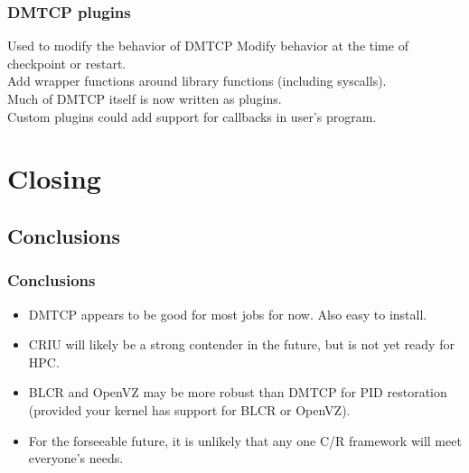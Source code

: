 \documentclass[compress]{beamer}
\begin{document}
\begin{frame}
\frametitle{DMTCP plugins}

\begin{block}{Used to modify the behavior of DMTCP}
Modify behavior at the time of checkpoint or restart.\\
\vspace{1ex}
Add wrapper functions around library functions (including syscalls).\\ 
\vspace{1ex}
Much of DMTCP itself is now written as plugins.\\
\vspace{1ex}
Custom plugins could add support for callbacks in user's program.\\
\end{block}

\end{frame}





\section{Closing}           %


\subsection{Conclusions}
\begin{frame}
\frametitle{Conclusions}

\begin{itemize}
\item DMTCP appears to be good for most jobs for now. Also easy to install.
\item CRIU will likely be a strong contender in the future, but is not
yet ready for HPC.
\item BLCR and OpenVZ may be more robust than DMTCP for PID restoration (provided
your kernel has support for BLCR or OpenVZ).
\item For the forseeable future, it is unlikely that any one C/R framework
will meet everyone's needs.


\end{itemize}

\end{frame}
\end{document}
